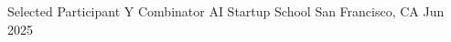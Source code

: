 



\begin{cvhonors}
  \cvhonor
    {Selected Participant} %
    {Y Combinator AI Startup School} %
    {San Francisco, CA} %
    {Jun 2025} %

\end{cvhonors}

